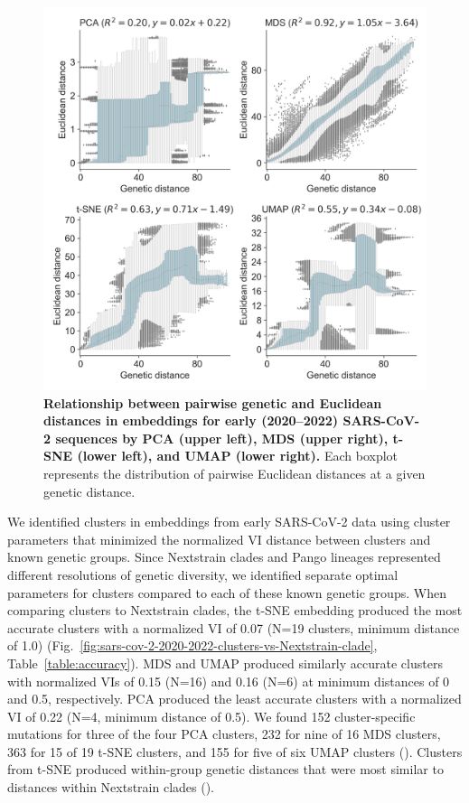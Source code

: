 \documentclass[10pt,letterpaper]{article}
\begin{document}
\begin{figure}[!h]
\includegraphics[width=\columnwidth]{figures/sarscov2-euclidean-distance-by-genetic-distance.png}
\caption{{\bf Relationship between pairwise genetic and Euclidean distances in embeddings for early (2020--2022) SARS-CoV-2 sequences by PCA (upper left), MDS (upper right), t-SNE (lower left), and UMAP (lower right).}
  Each boxplot represents the distribution of pairwise Euclidean distances at a given genetic distance.
}
\label{fig:sars-cov-2-pairwise-distances}
\end{figure}

We identified clusters in embeddings from early SARS-CoV-2 data using cluster parameters that minimized the normalized VI distance between clusters and known genetic groups.
Since Nextstrain clades and Pango lineages represented different resolutions of genetic diversity, we identified separate optimal parameters for clusters compared to each of these known genetic groups.
When comparing clusters to Nextstrain clades, the t-SNE embedding produced the most accurate clusters with a normalized VI of 0.07 (N=19 clusters, minimum distance of 1.0) (Fig.~\ref{fig:sars-cov-2-2020-2022-clusters-vs-Nextstrain-clade}, Table~\ref{table:accuracy}).
MDS and UMAP produced similarly accurate clusters with normalized VIs of 0.15 (N=16) and 0.16 (N=6) at minimum distances of 0 and 0.5, respectively.
PCA produced the least accurate clusters with a normalized VI of 0.22 (N=4, minimum distance of 0.5).
We found 152 cluster-specific mutations for three of the four PCA clusters, 232 for nine of 16 MDS clusters, 363 for 15 of 19 t-SNE clusters, and 155 for five of six UMAP clusters ().
Clusters from t-SNE produced within-group genetic distances that were most similar to distances within Nextstrain clades ().
\end{document}
